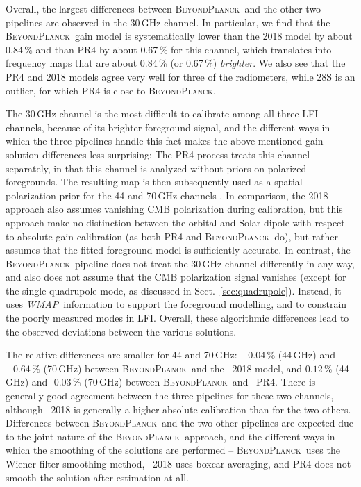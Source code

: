 \documentclass[twocolumn]{aa}
\def\WMAP{\textit{WMAP}}
\newcommand{\BP}{\textsc{BeyondPlanck}}
\begin{document}
Overall, the largest differences between \BP\ and the other two pipelines are
observed in the 30\,GHz channel. In particular, we find that the \BP\ gain
model is systematically lower than the 2018 model by about 0.84\,\% and than
PR4 by about 0.67\,\% for this channel, which translates into frequency maps
that are about 0.84\,\% (or 0.67\,\%) \emph{brighter}. We also see that the PR4
and 2018 models agree very well for three of the radiometers, while 28S is an
outlier, for which PR4 is close to \BP. 

The 30\,GHz channel is the most difficult to calibrate
among all three LFI channels, because of its brighter foreground
signal, and the different ways in which the three pipelines handle this fact makes the above-mentioned gain solution differences less surprising: The PR4 process treats this channel separately,
in that this channel is analyzed without priors on polarized foregrounds.
The resulting map is then subsequently used as a spatial
polarization prior for the 44 and 70\,GHz channels
\citep{planck2020-LVII}. In comparison, the 2018 approach also assumes
vanishing CMB polarization during calibration, but this approach make
no distinction between the orbital and Solar dipole with respect to
absolute gain calibration (as both PR4 and \BP\ do), but rather
assumes that the fitted foreground model is sufficiently accurate. In
contrast, the \BP\ pipeline does not treat the 30\,GHz channel
differently in any way, and also does not assume that the CMB
polarization signal vanishes (except for the single quadrupole mode,
as discussed in Sect.~\ref{sec:quadrupole}). Instead, it uses
\WMAP\ information to support the foreground modelling, and to
constrain the poorly measured modes in LFI. Overall, these
algorithmic differences lead to the observed deviations between the
various solutions.

The relative differences are smaller for 44 and 70\,GHz: $-0.04\,\%$  (44\,GHz) and $-0.64\,\%$ (70\,GHz) between \BP\ and the \Planck\ 2018 model, and $0.12\,\%$ (44\,GHz) and -$0.03\,\%$ (70\,GHz) between \BP\ and \Planck\ PR4. There is generally good agreement between the three pipelines for these two channels, although \Planck\ 2018 is generally a higher absolute calibration than for the two others. Differences between \BP\ and the two other pipelines are expected due to the joint nature of the \BP\ approach, and the different ways in which the smoothing of the solutions are performed -- \BP\ uses the Wiener filter smoothing method, \Planck\ 2018 uses boxcar averaging, and PR4 does not smooth the solution after estimation at all.
\end{document}
